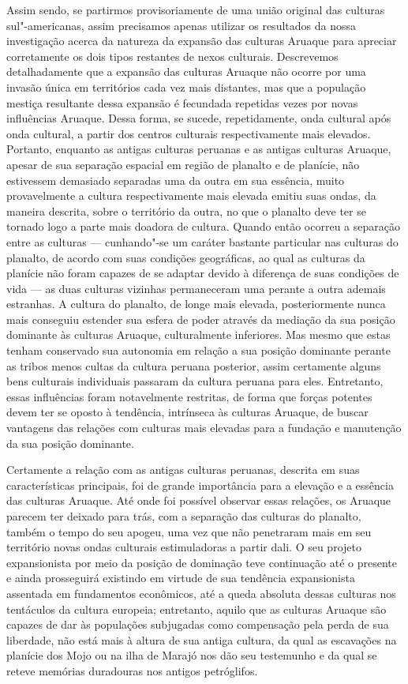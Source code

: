 Assim sendo, se partirmos provisoriamente de uma união original das
culturas sul"-americanas, assim precisamos apenas utilizar os resultados
da nossa investigação acerca da natureza da expansão das culturas
Aruaque para apreciar corretamente os dois tipos restantes de nexos
culturais. Descrevemos detalhadamente que a expansão das culturas
Aruaque não ocorre por uma invasão única em territórios cada vez mais
distantes, mas que a população mestiça resultante dessa expansão é
fecundada repetidas vezes por novas influências Aruaque. Dessa forma, se
sucede, repetidamente, onda cultural após onda cultural, a partir dos
centros culturais respectivamente mais elevados. Portanto, enquanto as
antigas culturas peruanas e as antigas culturas Aruaque, apesar de sua
separação espacial em região de planalto e de planície, não estivessem
demasiado separadas uma da outra em sua essência, muito provavelmente a
cultura respectivamente mais elevada emitiu suas ondas, da maneira
descrita, sobre o território da outra, no que o planalto deve ter se
tornado logo a parte mais doadora de cultura. Quando então ocorreu a
separação entre as culturas --- cunhando"-se um caráter bastante
particular nas culturas do planalto, de acordo com suas condições
geográficas, ao qual as culturas da planície não foram capazes de se
adaptar devido à diferença de suas condições de vida --- as duas
culturas vizinhas permaneceram uma perante a outra ademais estranhas. A
cultura do planalto, de longe mais elevada, posteriormente nunca mais
conseguiu estender sua esfera de poder através da mediação da sua
posição dominante às culturas Aruaque, culturalmente inferiores. Mas
mesmo que estas tenham conservado sua autonomia em relação a sua posição
dominante perante as tribos menos cultas da cultura peruana posterior,
assim certamente alguns bens culturais individuais passaram da cultura
peruana para eles. Entretanto, essas influências foram notavelmente
restritas, de forma que forças potentes devem ter se oposto à tendência,
intrínseca às culturas Aruaque, de buscar vantagens das relações com
culturas mais elevadas para a fundação e manutenção da sua posição
dominante.

Certamente a relação com as antigas culturas peruanas, descrita em suas
características principais, foi de grande importância para a elevação e
a essência das culturas Aruaque. Até onde foi possível observar essas
relações, os Aruaque parecem ter deixado para trás, com a separação das
culturas do planalto, também o tempo do seu apogeu, uma vez que não
penetraram mais em seu território novas ondas culturais estimuladoras a
partir dali. O seu projeto expansionista por meio da posição de
dominação teve continuação até o presente e ainda prosseguirá existindo
em virtude de sua tendência expansionista assentada em fundamentos
econômicos, até a queda absoluta dessas culturas nos tentáculos da
cultura europeia; entretanto, aquilo que as culturas Aruaque são capazes
de dar às populações subjugadas como compensação pela perda de sua
liberdade, não está mais à altura de sua antiga cultura, da qual as
escavações na planície dos Mojo ou na ilha de Marajó nos dão seu
testemunho e da qual se reteve memórias duradouras nos antigos
petróglifos.

